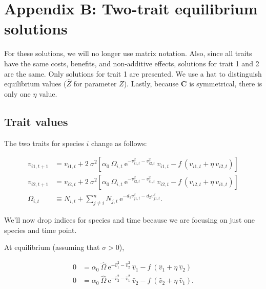 \section*{Appendix B: Two-trait equilibrium solutions}

\renewcommand{\thefigure}{B\arabic{figure}}
\renewcommand{\theequation}{B\arabic{equation}}
\renewcommand{\thetable}{B\arabic{table}}
\setcounter{equation}{0}
\setcounter{figure}{0}
\setcounter{table}{0}


For these solutions, we will no longer use matrix notation.
Also, since all traits have the same costs, benefits, and
non-additive effects, solutions for trait 1 and 2 are the same.
Only solutions for trait 1 are presented.
We use a hat to distinguish equilibrium values
($\hat{Z}$ for parameter $Z$).
Lastly, because $\mathbf{C}$ is symmetrical, there is only one $\eta$ value.


\subsection*{Trait values}

The two traits for species $i$ change as follows:

\begin{equation*}
\begin{split}
    v_{i1,t+1} &= v_{i1,t} + 2 ~ \sigma^2
    \left[
        \alpha_0 ~ \Omega_{i,t} ~
            \textrm{e}^{-v_{i1,t}^2 - v_{i2,t}^2} ~ v_{i1,t}
        - f ~ ( v_{i1,t} + \eta ~ v_{i2,t} )
    \right] \\
    v_{i2,t+1} &= v_{i2,t} + 2 ~ \sigma^2
    \left[
        \alpha_0 ~ \Omega_{i,t} ~
            \textrm{e}^{-v_{i2,t}^2 - v_{i1,t}^2} ~ v_{i2,t}
        - f ~ ( v_{i2,t} + \eta ~ v_{i1,t} )
    \right] \\
    \Omega_{i,t} &\equiv N_{i,t} +
        \sum_{j \ne i}^{n}{ N_{j,t} ~ \textrm{e}^{
                - d_1 v_{j1,t}^2 - d_2 v_{j1,t}^2 } }
    \textrm{.}
\end{split}
\end{equation*}


We'll now drop indices for species and time because we are
focusing on just one species and time point.


At equilibrium (assuming that $\sigma > 0$),

\begin{equation}
\begin{split}
    0 &= \alpha_0 ~ \hat{\Omega} ~
            \textrm{e}^{-\hat{v}_{1}^2 - \hat{v}_{2}^2} ~ \hat{v}_{1}
        - f ~ ( \hat{v}_{1} + \eta ~ \hat{v}_{2} ) \\
    0 &=
        \alpha_0 ~ \hat{\Omega} ~
            \textrm{e}^{-\hat{v}_{2}^2 - \hat{v}_{1}^2} ~ \hat{v}_{2}
        - f ~ ( \hat{v}_{2} + \eta ~ \hat{v}_{1} )
    \textrm{.}
\end{split}
\label{eq:two-traits-v-eq1}
\end{equation}


